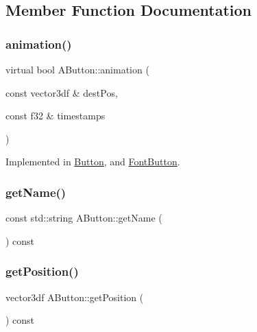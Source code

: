 \subsection{Member Function Documentation}
\mbox{\label{class_a_button_a6ceaa1f1062009f1206fad570d07afbc}} 
\subsubsection{\texorpdfstring{animation()}{animation()}}
{\footnotesize\ttfamily virtual bool A\+Button\+::animation (\begin{DoxyParamCaption}\item[{const vector3df \&}]{dest\+Pos,  }\item[{const f32 \&}]{timestamps }\end{DoxyParamCaption})\hspace{0.3cm}{\ttfamily [pure virtual]}}



Implemented in \mbox{\hyperlink{class_button_a0bd4601e48eb6ef67ee192561fa4cfd0}{Button}}, and \mbox{\hyperlink{class_font_button_aa5855d430b2f25d72a847c60a03ff159}{Font\+Button}}.

\mbox{\label{class_a_button_a3c6b399f37adccb376c2a22d3448be1a}} 
\subsubsection{\texorpdfstring{getName()}{getName()}}
{\footnotesize\ttfamily const std\+::string A\+Button\+::get\+Name (\begin{DoxyParamCaption}{ }\end{DoxyParamCaption}) const}

\mbox{\label{class_a_button_a268ae43108368ac706654f306da2ef15}} 
\subsubsection{\texorpdfstring{getPosition()}{getPosition()}}
{\footnotesize\ttfamily vector3df A\+Button\+::get\+Position (\begin{DoxyParamCaption}{ }\end{DoxyParamCaption}) const}

